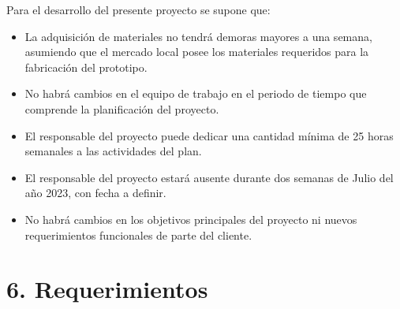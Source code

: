 \documentclass[
11pt, %
codirector, %
]{charter}
\begin{document}

Para el desarrollo del presente proyecto se supone que:

\begin{itemize}
	\item La adquisición de materiales no tendrá demoras mayores a una semana, asumiendo que el mercado local posee los materiales requeridos para la fabricación del prototipo.
	\item No habrá cambios en el equipo de trabajo en el periodo de tiempo que comprende la planificación del proyecto.
	\item El responsable del proyecto puede dedicar una cantidad mínima de 25 horas semanales a las actividades del plan.
	\item El responsable del proyecto estará ausente durante dos semanas de Julio del año 2023, con fecha a definir.
	\item No habrá cambios en los objetivos principales del proyecto ni nuevos requerimientos funcionales de parte del cliente.
\end{itemize}

\section{6. Requerimientos}
\label{sec:requerimientos}


\end{document}
